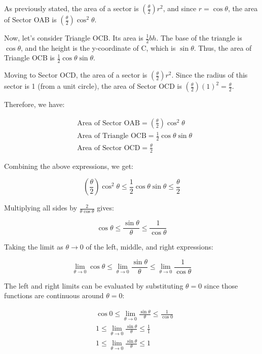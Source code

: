 \documentclass{article}
\begin{document}
As previously stated, the area of a sector is $\left(\frac{\theta}{2}\right)r^2$, and since $r=\cos \theta$, the area of Sector OAB is $\left(\frac{\theta}{2}\right)\cos^2\theta$.

Now, let’s consider Triangle OCB. Its area is $\frac{1}{2}bh$. The base of the triangle is $\cos \theta$, and the height is the y-coordinate of C, which is $\sin \theta$. Thus, the area of Triangle OCB is $\frac{1}{2}\cos \theta \sin \theta$.

Moving to Sector OCD, the area of a sector is $\left(\frac{\theta}{2}\right)r^2$. Since the radius of this sector is 1 (from a unit circle), the area of Sector OCD is $\left(\frac{\theta}{2}\right)(1)^2 = \frac{\theta}{2}$.

Therefore, we have:

\begin{align*}
    &\text{Area of Sector OAB} = \left(\frac{\theta}{2} \right)\cos^2\theta\\
    &\text{Area of Triangle OCB} = \frac{1}{2}\cos \theta \sin \theta \\
    &\text{Area of Sector OCD} = \frac{\theta}{2}
\end{align*}

Combining the above expressions, we get:

\begin{equation*}
    \left(\frac{\theta}{2} \right)\cos ^2 \theta \leq \frac{1}{2}\cos \theta \sin \theta \leq \frac{\theta}{2}
\end{equation*}

Multiplying all sides by $\frac{2}{\theta \cos \theta}$ gives:

$$\cos \theta \leq \frac{\sin \theta}{\theta} \leq \frac{1}{\cos \theta}$$

Taking the limit as $\theta \to 0$ of the left, middle, and right expressions:

$$\lim_{\theta \to 0}\cos \theta \leq \lim_{\theta \to 0}\frac{\sin \theta}{\theta} \leq \lim_{\theta \to 0}\frac{1}{\cos \theta}$$

The left and right limits can be evaluated by substituting $\theta=0$ since those functions are continuous around $\theta=0$:

\begin{align*}
   & \cos 0 \leq \lim_{\theta \to 0} \frac{\sin \theta}{\theta} \leq \frac{1}{\cos 0}\\
   & 1 \leq \lim_{\theta \to 0} \frac{\sin \theta}{\theta} \leq \frac{1}{1}\\
   & 1 \leq \lim_{\theta \to 0} \frac{\sin \theta}{\theta} \leq 1
\end{align*}
\end{document}
